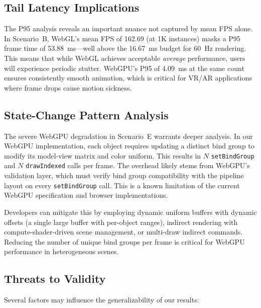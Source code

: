 \documentclass[conference]{IEEEtran}
\begin{document}
\subsection{Tail Latency Implications}

The P95 analysis reveals an important nuance not captured by mean FPS alone. In Scenario~B, WebGL's mean FPS of 162.69 (at 1K instances) masks a P95 frame time of 53.88~ms---well above the 16.67~ms budget for 60~Hz rendering. This means that while WebGL achieves acceptable \textit{average} performance, users will experience periodic stutter. WebGPU's P95 of 4.09~ms at the same count ensures consistently smooth animation, which is critical for VR/AR applications where frame drops cause motion sickness.

\subsection{State-Change Pattern Analysis}

The severe WebGPU degradation in Scenario~E warrants deeper analysis. In our WebGPU implementation, each object requires updating a distinct bind group to modify its model-view matrix and color uniform. This results in $N$ \texttt{setBindGroup} and $N$ \texttt{drawIndexed} calls per frame. The overhead likely stems from WebGPU's validation layer, which must verify bind group compatibility with the pipeline layout on every \texttt{setBindGroup} call. This is a known limitation of the current WebGPU specification and browser implementations.

Developers can mitigate this by employing dynamic uniform buffers with dynamic offsets (a single large buffer with per-object ranges), indirect rendering with compute-shader-driven scene management, or multi-draw indirect commands. Reducing the number of unique bind groups per frame is critical for WebGPU performance in heterogeneous scenes.

\subsection{Threats to Validity}

Several factors may influence the generalizability of our results:
\end{document}

